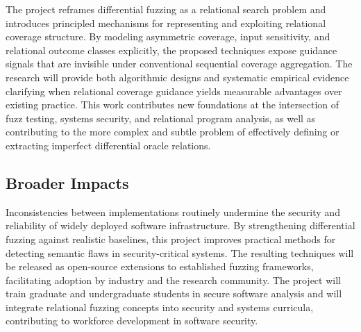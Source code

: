 \documentclass[11pt]{article}
\begin{document}
The project reframes differential fuzzing as a relational search problem and introduces principled mechanisms for representing and exploiting relational coverage structure. By modeling asymmetric coverage, input sensitivity, and relational outcome classes explicitly, the proposed techniques expose guidance signals that are invisible under conventional sequential coverage aggregation. The research will provide both algorithmic designs and systematic empirical evidence clarifying when relational coverage guidance yields measurable advantages over existing practice. This work contributes new foundations at the intersection of fuzz testing, systems security, and relational program analysis, as well as contributing to the more complex and subtle problem of effectively defining or extracting imperfect differential oracle relations.

\subsection*{Broader Impacts}

Inconsistencies between implementations routinely undermine the security and reliability of widely deployed software infrastructure. By strengthening differential fuzzing against realistic baselines, this project improves practical methods for detecting semantic flaws in security-critical systems. The resulting techniques will be released as open-source extensions to established fuzzing frameworks, facilitating adoption by industry and the research community. The project will train graduate and undergraduate students in secure software analysis and will integrate relational fuzzing concepts into security and systems curricula, contributing to workforce development in software security.
\end{document}
